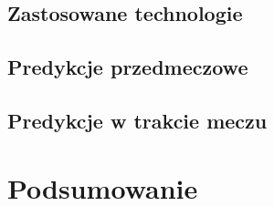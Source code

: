 \section{Zastosowane technologie}
\label{Sec:BotTech}

\section{Predykcje przedmeczowe}
\label{Sec:PredykcjePrzed}

\section{Predykcje w trakcie meczu}
\label{Sec:PredykcjeLive}

\chapter{Podsumowanie}




\listoffigures
\listoftables


